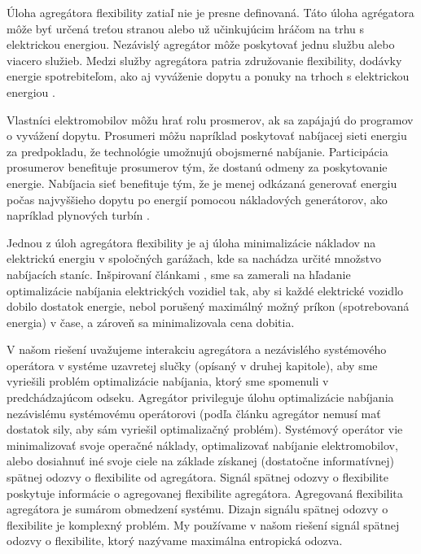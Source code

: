 
Úloha agregátora flexibility zatiaľ nie je presne definovaná. Táto úloha agrégatora môže byť určená treťou stranou alebo už učinkujúcim hráčom na trhu s elektrickou energiou. Nezávislý agregátor môže poskytovať jednu službu alebo viacero služieb. Medzi služby agregátora patria združovanie flexibility, dodávky energie spotrebiteľom, ako aj vyváženie dopytu a ponuky na trhoch s elektrickou energiou \cite{Granado2023}.

Vlastníci elektromobilov môžu hrať rolu prosmerov, ak sa zapájajú do programov o vyvážení dopytu. Prosumeri môžu napríklad poskytovať nabíjacej sieti energiu za predpokladu, že technológie umožnujú obojsmerné nabíjanie. Participácia prosumerov benefituje prosumerov tým, že dostanú odmeny za poskytovanie energie. Nabíjacia sieť benefituje tým, že je menej odkázaná generovať energiu počas najvyššieho dopytu po energií pomocou nákladových generátorov, ako napríklad plynových turbín \cite{review-on-smart-charging}.

Jednou z úloh agregátora flexibility je aj úloha minimalizácie nákladov na elektrickú energiu v spoločných garážach, kde sa nachádza určité množstvo nabíjacích staníc. Inšpirovaní článkami \cite{Li_information_aggregation, Li_2021,li2020realtimeflexibilityfeedbackclosedloop, chen2021smoothed, offlineoptimal}, sme sa zamerali na hľadanie optimalizácie nabíjania elektrických vozidiel tak, aby si každé elektrické vozidlo dobilo dostatok energie, nebol porušený maximálný možný príkon (spotrebovaná energia) v čase, a zároveň sa minimalizovala cena dobitia.

V našom riešení uvažujeme interakciu agregátora a nezávislého systémového operátora v systéme uzavretej slučky (opísaný v druhej kapitole), aby sme vyriešili problém optimalizácie nabíjania, ktorý sme spomenuli v predchádzajúcom odseku. Agregátor privileguje úlohu optimalizácie nabíjania nezávislému systémovému operátorovi (podľa článku \cite{Li_information_aggregation} agregátor nemusí mať dostatok sily, aby sám vyriešil  optimalizačný problém). Systémový operátor vie minimalizovať svoje operačné náklady, optimalizovať nabíjanie elektromobilov, alebo dosiahnuť iné svoje ciele na základe získanej (dostatočne informatívnej) spätnej odozvy o flexibilite od agregátora. Signál spätnej odozvy o flexibilite poskytuje informácie o agregovanej flexibilite agregátora. Agregovaná flexibilita agregátora je sumárom obmedzení systému. Dizajn signálu spätnej odozvy o flexibilite je komplexný problém. My používame v našom riešení signál spätnej odozvy o flexibilite, ktorý nazývame maximálna entropická odozva.

